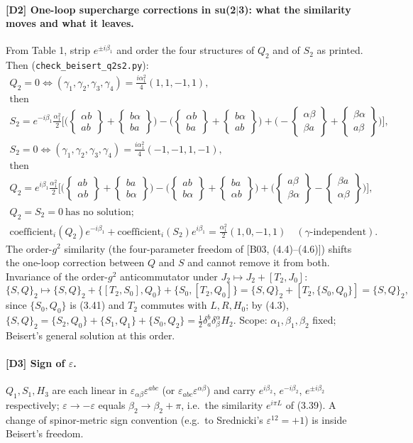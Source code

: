 \documentclass[10pt]{article}
\newcommand{\bs}[2]{\left\{\begin{smallmatrix}#1\\ #2\end{smallmatrix}\right\}}
\begin{document}
\paragraph{[D2] One-loop supercharge corrections in su(2$|$3): what the similarity moves and what it leaves.} From Table 1, strip $e^{\pm i\beta_1}$ and order the four structures of $Q_2$ and of $S_2$ as printed. Then (\texttt{check\_beisert\_\allowbreak q2s2.py}):
\begin{gather*}
Q_2=0\iff(\gamma_1,\gamma_2,\gamma_3,\gamma_4)=\tfrac{i\alpha_1^2}{4}(1,1,-1,1),\\ \text{then}\\ S_2=e^{-i\beta_1}\tfrac{\alpha_1^2}2\Big[\Big(\bs{\alpha b}{ab}+\bs{b\alpha}{ba}\Big)-\Big(\bs{\alpha b}{ba}+\bs{b\alpha}{ab}\Big)+\Big(-\bs{\alpha\beta}{\beta a}+\bs{\beta\alpha}{a\beta}\Big)\Big],
\end{gather*}
\begin{gather*}
S_2=0\iff(\gamma_1,\gamma_2,\gamma_3,\gamma_4)=\tfrac{i\alpha_1^2}{4}(-1,-1,1,-1),\\ \text{then}\\ Q_2=e^{i\beta_1}\tfrac{\alpha_1^2}2\Big[\Big(\bs{ab}{\alpha b}+\bs{ba}{b\alpha}\Big)-\Big(\bs{ab}{b\alpha}+\bs{ba}{\alpha b}\Big)+\Big(\bs{a\beta}{\beta\alpha}-\bs{\beta a}{\alpha\beta}\Big)\Big],
\end{gather*}
\begin{gather*}
Q_2=S_2=0\ \text{has no solution};\\ \text{coefficient}_i(Q_2)e^{-i\beta_1}+\text{coefficient}_i(S_2)e^{i\beta_1}=\tfrac{\alpha_1^2}{2}(1,0,-1,1)\quad(\gamma\text{-independent}).
\end{gather*}
The order-$g^2$ similarity (the four-parameter freedom of [B03, (4.4)--(4.6)]) shifts the one-loop correction between $Q$ and $S$ and cannot remove it from both. Invariance of the order-$g^2$ anticommutator under $J_2\mapsto J_2+[T_2,J_0]$:
\begin{equation*}
\{S,Q\}_2\mapsto\{S,Q\}_2+\{[T_2,S_0],Q_0\}+\{S_0,[T_2,Q_0]\}=\{S,Q\}_2+[T_2,\{S_0,Q_0\}]=\{S,Q\}_2,
\end{equation*}
since $\{S_0,Q_0\}$ is (3.41) and $T_2$ commutes with $L,R,H_0$; by (4.3), $\{S,Q\}_2=\{S_2,Q_0\}+\{S_1,Q_1\}+\{S_0,Q_2\}=\frac12\delta^b_a\delta^\alpha_\beta H_2$. Scope: $\alpha_1,\beta_1,\beta_2$ fixed; Beisert's general solution at this order.

\paragraph{[D3] Sign of $\varepsilon$.} $Q_1,S_1,H_3$ are each linear in $\varepsilon_{\alpha\beta}\varepsilon^{abc}$ (or $\varepsilon_{abc}\varepsilon^{\alpha\beta}$) and carry $e^{i\beta_2}$, $e^{-i\beta_2}$, $e^{\pm i\beta_2}$ respectively; $\varepsilon\to-\varepsilon$ equals $\beta_2\to\beta_2+\pi$, i.e.\ the similarity $e^{i\pi L}$ of (3.39). A change of spinor-metric sign convention (e.g.\ to Srednicki's $\varepsilon^{12}=+1$) is inside Beisert's freedom.
\end{document}

